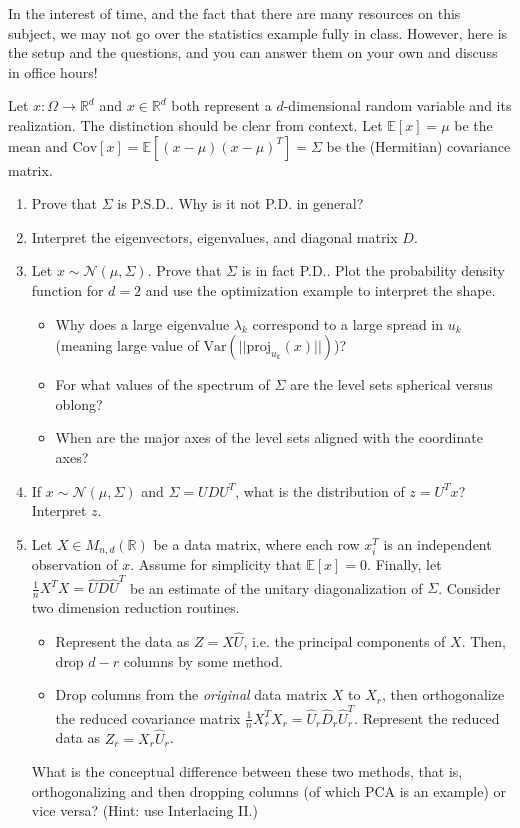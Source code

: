\documentclass[11pt]{article}
\newcommand{\R}{\ensuremath{\mathbb R}}
\newcommand{\EV}{\ensuremath{\mathbb E}}
\theoremstyle{plain}
\theoremstyle{definition}
\theoremstyle{remark}
\begin{document}
In the interest of time, and the fact that there are many resources on this subject, we may not go over the statistics example fully in class. However, here is the setup and the questions, and you can answer them on your own and discuss in office hours!

Let $x: \Omega \rightarrow \R^d$ and $x \in \R^d$ both represent a $d$-dimensional random variable and its realization. The distinction should be clear from context. Let $\EV[x] = \mu$ be the mean and $\text{Cov}[x] = \EV[(x - \mu)(x - \mu)^T] = \Sigma$ be the (Hermitian) covariance matrix.
\begin{enumerate}
    \item Prove that $\Sigma$ is P.S.D.. Why is it not P.D. in general?
    \item Interpret the eigenvectors, eigenvalues, and diagonal matrix $D$.
    \item Let $x \sim \mathcal{N}(\mu, \Sigma)$. Prove that $\Sigma$ is in fact P.D.. Plot the probability density function for $d = 2$ and use the optimization example to interpret the shape.
    \begin{itemize}
        \item Why does a large eigenvalue $\lambda_k$ correspond to a large spread in $u_k$ (meaning large value of $\text{Var}(||\text{proj}_{u_k}(x)||)$)?
        \item For what values of the spectrum of $\Sigma$ are the level sets spherical versus oblong?
        \item When are the major axes of the level sets aligned with the coordinate axes?
    \end{itemize}
    \item If $x \sim \mathcal{N}(\mu, \Sigma)$ and $\Sigma = UDU^T$, what is the distribution of $z = U^T x$? Interpret $z$.
    \item Let $X \in M_{n, d}(\R)$ be a data matrix, where each row $x^T_i$ is an independent observation of $x$. Assume for simplicity that $\EV[x] = 0$. Finally, let $\frac{1}{n} X^T X = \hat{U} \hat{D}\hat{U}^T$ be an estimate of the unitary diagonalization of $\Sigma$. Consider two dimension reduction routines.
    \begin{itemize}
        \item Represent the data as $Z = X\hat{U}$, i.e. the principal components of $X$. Then, drop $d - r$ columns by some method.
        \item Drop columns from the {\it original} data matrix $X$ to $X_r$, then orthogonalize the reduced covariance matrix $\frac{1}{n} X_r^T X_r = \hat{U}_r \hat{D}_r\hat{U}^T_r$. Represent the reduced data as $Z_r = X_r \hat{U}_r$.
    \end{itemize}
    What is the conceptual difference between these two methods, that is, orthogonalizing and then dropping columns (of which PCA is an example) or vice versa? (Hint: use Interlacing II.)
\end{enumerate}
\end{document}
